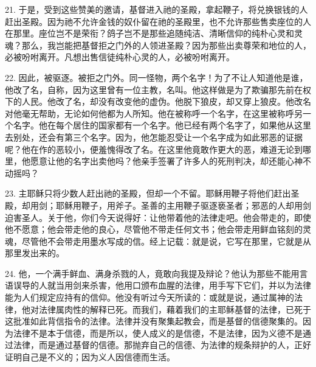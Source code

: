 21. 于是，受到这些赞美的邀请，基督进入祂的圣殿，拿起鞭子，将兑换银钱的人赶出圣殿。因为祂不允许金钱的奴仆留在祂的圣殿里，也不允许那些售卖座位的人在那里。座位岂不是荣衔？鸽子岂不是那些追随纯洁、清晰信仰的纯朴心灵和灵魂？那么，我岂能把基督拒之门外的人领进圣殿？因为那些出卖尊荣和地位的人，必被吩咐离开。凡想出售信徒纯朴心灵的人，必被吩咐离开。\par

\newline{}22. 因此，被驱逐。被拒之门外。同一怪物，两个名字！为了不让人知道他是谁，他改了名，自称，因为这里曾有一位主教，名叫。他这样做是为了欺骗那先前在权下的人民。他改了名，却没有改变他的虚伪。他脱下狼皮，却又穿上狼皮。他改名对他毫无帮助，无论如何他都为人所知。他在被称呼一个名字，在这里被称呼另一个名字。他在每个居住的国家都有一个名字。他已经有两个名字了，如果他从这里去别处，还会有第三个名字。因为，他怎能忍受让一个名字成为如此邪恶的证据呢？他在作的恶较小，便羞愧得改了名。在这里他竟敢作更大的恶，难道无论到哪里，他愿意让他的名字出卖他吗？他亲手签署了许多人的死刑判决，却还能心神不动摇吗？\newline{}\par

\newline{}23. 主耶稣只将少数人赶出祂的圣殿，但却一个不留。耶稣用鞭子将他们赶出圣殿，却用剑；耶稣用鞭子，用斧子。圣善的主用鞭子驱逐亵圣者；邪恶的人却用剑迫害圣人。关于他，你们今天说得好：让他带着他的法律走吧。他会带走的，即使他不愿意；他会带走他的良心，尽管他不带走任何文书；他会带走用鲜血铭刻的灵魂，尽管他不会带走用墨水写成的信。经上记载：就是说，它写在那里，它就是从那里发出来的。\newline{}\par

\newline{}24. 他，一个满手鲜血、满身杀戮的人，竟敢向我提及辩论？他认为那些不能用言语误导的人就当用剑来杀害，他用口颁布血腥的法律，用手写下它们，并以为法律能为人们规定应持有的信仰。他没有听过今天所读的：或就是说，通过属神的法律，他对法律属肉性的解释已死。而我们，藉着我们的主耶稣基督的法律，已死于这批准如此背信指令的法律。法律并没有聚集起教会，而是基督的信德聚集的。因为法律不是本于信德，而是所以，使人成义的是信德，不是法律，因为义德不是通过法律，而是通过基督的信德。那抛弃自己的信德、为法律的规条辩护的人，正好证明自己是不义的；因为义人因信德而生活。\newline{}\par

